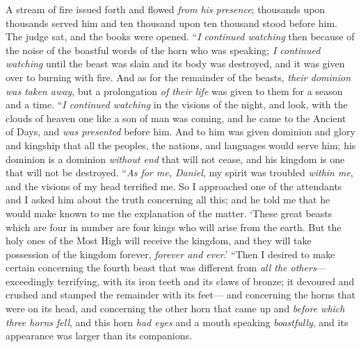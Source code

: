 \begin{biblechapter}
\verse A stream of fire issued forth and flowed \textit{from his presence}; thousands upon thousands served him and ten thousand upon ten thousand stood before him. The judge sat, and the books were opened.
\verse “\textit{I continued watching} then because of the noise of the boastful words of the horn who was speaking; \textit{I continued watching} until the beast was slain and its body was destroyed, and it was given over to burning with fire.
\verse And as for the remainder of the beasts, \textit{their dominion was taken away}, but a prolongation \textit{of their life} was given to them for a season and a time.
\verse “\textit{I continued watching} in the visions of the night, and look, with the clouds of heaven one like a son of man was coming, and he came to the Ancient of Days, and \textit{was presented} before him.
\verse And to him was given dominion and glory and kingship that all the peoples, the nations, and languages would serve him; his dominion is a dominion \textit{without end} that will not cease, and his kingdom is one that will not be destroyed.
 “\textit{As for me, Daniel}, my spirit was troubled \textit{within me}, and the visions of my head terrified me.
\verse So I approached one of the attendants and I asked him about the truth concerning all this; and he told me that he would make known to me the explanation of the matter.
\verse ‘These great beasts which are four in number are four kings who will arise from the earth.
\verse But the holy ones of the Most High will receive the kingdom, and they will take possession of the kingdom forever, \textit{forever and ever}.’
\verse “Then I desired to make certain concerning the fourth beast that was different from \textit{all the others}—exceedingly terrifying, with its iron teeth and its claws of bronze; it devoured and crushed and stamped the remainder with its feet—
\verse and concerning the horns that were on its head, and concerning the other horn that came up and \textit{before which three horns fell}, and this horn \textit{had eyes} and a mouth speaking \textit{boastfully}, and its appearance was larger than its companions.

\end{biblechapter}
